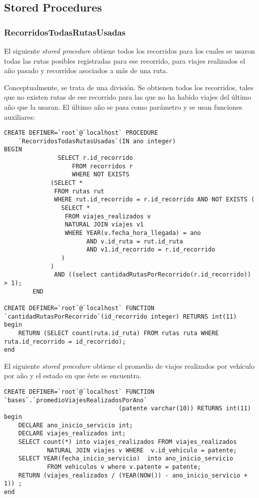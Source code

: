 \subsection{Stored Procedures}

\subsubsection*{RecorridosTodasRutasUsadas}


El siguiente \textit{stored procedure} obtiene todos los recorridos para los cuales se usaron todas las rutas posibles registradas para ese  recorrido, para viajes realizados el año pasado y recorridos asociados a más de una ruta.

Conceptualmente, se trata de una divisi\'on. Se obtienen todos los recorridos, tales que no existen rutas de ese recorrido para las que no ha habido viajes del \'ultimo a\~no que la usaran. El \'ultimo año se pasa como par\'ametro y se usan funciones auxiliares:

\begin{verbatim}
CREATE DEFINER=`root`@`localhost` PROCEDURE  
	`RecorridosTodasRutasUsadas`(IN ano integer)
BEGIN
		       SELECT r.id_recorrido
	       	       FROM recorridos r
	       	       WHERE NOT EXISTS
			 (SELECT *
			  FROM rutas rut
			  WHERE rut.id_recorrido = r.id_recorrido AND NOT EXISTS (
				SELECT *
				 FROM viajes_realizados v
				 NATURAL JOIN viajes v1
				 WHERE YEAR(v.fecha_hora_llegada) = ano
				       AND v.id_ruta = rut.id_ruta
				       AND v1.id_recorrido = r.id_recorrido
				) 
			 )			
		      AND ((select cantidadRutasPorRecorrido(r.id_recorrido)) > 1);
		END
		
CREATE DEFINER=`root`@`localhost` FUNCTION  
`cantidadRutasPorRecorrido`(id_recorrido integer) RETURNS int(11)
begin
    RETURN (SELECT count(ruta.id_ruta) FROM rutas ruta WHERE ruta.id_recorrido = id_recorrido);
end
\end{verbatim}

El siguiente \textit{stored procedure} obtiene el promedio de viajes realizados por veh\'iculo por a\~no y el estado en que \'este se encuentra.

\begin{verbatim}
CREATE DEFINER=`root`@`localhost` FUNCTION  `bases`.`promedioViajesRealizadosPorAno`
								(patente varchar(10)) RETURNS int(11)
begin
    DECLARE ano_inicio_servicio int;
    DECLARE viajes_realizados int;
    SELECT count(*) into viajes_realizados FROM viajes_realizados 
    		NATURAL JOIN viajes v WHERE  v.id_vehiculo = patente;
    SELECT YEAR(fecha_inicio_servicio)  into ano_inicio_servicio 
    		FROM vehiculos v where v.patente = patente;
    RETURN (viajes_realizados / (YEAR(NOW()) - ano_inicio_servicio + 1)) ;
end
\end{verbatim}

